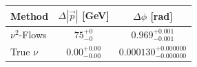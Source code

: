     \begin{tabular}{lcc}
        \toprule
        Method & $\Delta |\vec p|$ [GeV] & $\Delta \phi$ [rad] \\
        \midrule
        $\nu^2$-Flows & $75_{-0}^{+0}$ & $0.969_{-0.001}^{+0.001}$ \\
        True $\nu$ & $0.00_{-0.00}^{+0.00}$ & $0.000130_{-0.000000}^{+0.000000}$ \\
        \bottomrule
    \end{tabular}